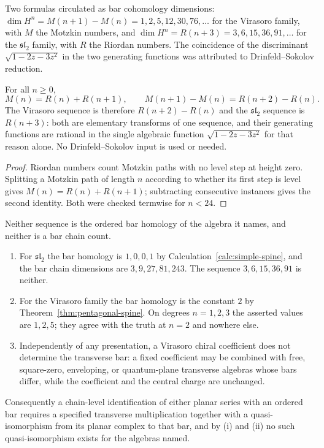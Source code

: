Two formulas circulated as bar cohomology dimensions:
$\dim H^n=M(n+1)-M(n)=1,2,5,12,30,76,\dots$ for the Virasoro family, with $M$
the Motzkin numbers, and $\dim H^n=R(n+3)=3,6,15,36,91,\dots$ for the
$\mathfrak{sl}_2$ family, with $R$ the Riordan numbers. The coincidence of the
discriminant $\sqrt{1-2z-3z^2}$ in the two generating functions was attributed
to Drinfeld--Sokolov reduction.

\begin{proposition}
\label{prop:one-sequence-spine}
For all $n\ge0$,
\[
 M(n)=R(n)+R(n+1),
 \qquad
 M(n+1)-M(n)=R(n+2)-R(n).
\]
The Virasoro sequence is therefore $R(n+2)-R(n)$ and the $\mathfrak{sl}_2$
sequence is $R(n+3)$: both are elementary transforms of one sequence, and their
generating functions are rational in the single algebraic function
$\sqrt{1-2z-3z^2}$ for that reason alone. No Drinfeld--Sokolov input is used or
needed.
\end{proposition}
\begin{proof}
Riordan numbers count Motzkin paths with no level step at height zero.
Splitting a Motzkin path of length $n$ according to whether its first step is
level gives $M(n)=R(n)+R(n+1)$; subtracting consecutive instances gives the
second identity. Both were checked termwise for $n<24$.
\end{proof}

\begin{theorem}
\label{thm:carrier-spine}
Neither sequence is the ordered bar homology of the algebra it names, and
neither is a bar chain count.
\begin{enumerate}
\item For $\mathfrak{sl}_2$ the bar homology is $1,0,0,1$ by
  Calculation~\ref{calc:simple-spine}, and the bar chain dimensions are
  $3,9,27,81,243$. The sequence $3,6,15,36,91$ is neither.
\item For the Virasoro family the bar homology is the constant $2$ by
  Theorem~\ref{thm:pentagonal-spine}. On degrees $n=1,2,3$ the asserted values
  are $1,2,5$; they agree with the truth at $n=2$ and nowhere else.
\item Independently of any presentation, a Virasoro chiral coefficient does not
  determine the transverse bar: a fixed coefficient may be combined with free,
  square-zero, enveloping, or quantum-plane transverse algebras whose bars
  differ, while the coefficient and the central charge are unchanged.
\end{enumerate}
Consequently a chain-level identification of either planar series with an
ordered bar requires a specified transverse multiplication together with a
quasi-isomorphism from its planar complex to that bar, and by (i) and (ii) no
such quasi-isomorphism exists for the algebras named.
\end{theorem}

